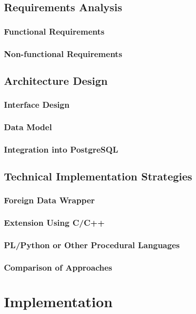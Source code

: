 \documentclass{article}
\begin{document}
\subsection{Requirements Analysis}
\subsubsection{Functional Requirements}
\subsubsection{Non-functional Requirements}

\subsection{Architecture Design}
\subsubsection{Interface Design}
\subsubsection{Data Model}
\subsubsection{Integration into PostgreSQL}

\subsection{Technical Implementation Strategies}
\subsubsection{Foreign Data Wrapper}
\subsubsection{Extension Using C/C++}
\subsubsection{PL/Python or Other Procedural Languages}
\subsubsection{Comparison of Approaches}

\newpage

\section{Implementation}
\end{document}

